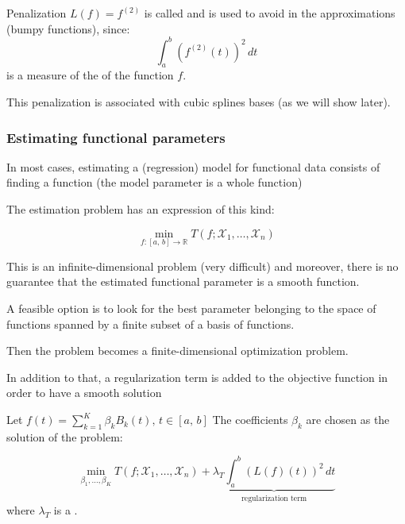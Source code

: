 Penalization $L(f) = f^{(2)}$ is called  and
is used to avoid  in the approximations (bumpy functions),
since:
\begin{equation*}
    \int_{a}^{b} \left(
        f^{(2)}(t)
    \right)^2\, dt
\end{equation*}
is a measure of the  of the function $f$.

\begin{note}
    This penalization is associated with cubic splines bases (as we will show later).
\end{note}

\subsubsection{Estimating functional parameters}

In most cases, estimating a (regression) model for functional data
consists of finding a function (the model parameter is a whole function)

The estimation problem has an expression of this kind:
\begin{problem}{}{}
    \begin{equation*}
        \min_{f:[a,\,b] \to \mathds R} T(f; \mathcal X_1,\ldots,\mathcal X_n)
    \end{equation*}
\end{problem}

This is an infinite-dimensional problem (very difficult) and moreover,
there is no guarantee that the estimated functional parameter is a smooth 
function.

A feasible option is to look for the best parameter belonging to the space of functions spanned by
a finite subset of a basis of functions.

Then the problem becomes a finite-dimensional optimization problem.

In addition to that, a regularization term is added to the objective function
in order to have a smooth solution

Let $f(t) = \sum_{k=1}^K \beta_k B_k(t),\,t\in [a,\,b]$
The coefficients $\beta_k$ are chosen as the solution of the problem:
\begin{problem}{}{}
    \begin{equation*}
        \min_{\beta_1,\ldots,\beta_K} T(f; \mathcal X_1,\ldots,\mathcal X_n)
        + \underbrace{\lambda_T \int_{a}^{b} \left(
            L(f)(t)
    \right)^2\, dt}_{\text{regularization term}}
    \end{equation*}
where $\lambda_T$ is a .
\end{problem}

